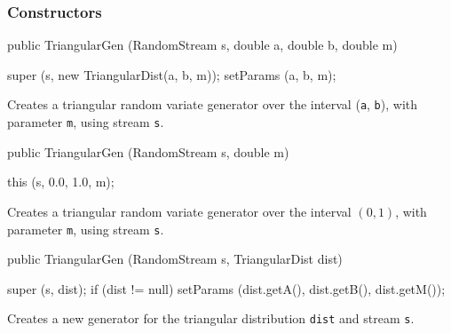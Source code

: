 \subsubsection* {Constructors}
\begin{code}

   public TriangularGen (RandomStream s, double a, double b, double m) \begin{hide} {
      super (s, new TriangularDist(a, b, m));
      setParams (a, b, m);
   }\end{hide}
\end{code} 
\begin{tabb}  Creates a triangular random variate generator over the interval
(\texttt{a}, \texttt{b}), with parameter \texttt{m}, using stream \texttt{s}. 
\end{tabb}
\begin{code}

   public TriangularGen (RandomStream s, double m) \begin{hide} {
      this (s, 0.0, 1.0, m);
   }\end{hide}
\end{code} 
\begin{tabb}  Creates a triangular random variate generator over the interval
  $(0, 1)$, with parameter \texttt{m}, using stream \texttt{s}.
\end{tabb}
\begin{code}
 
   public TriangularGen (RandomStream s, TriangularDist dist) \begin{hide} {
      super (s, dist);
      if (dist != null)
         setParams (dist.getA(), dist.getB(), dist.getM());
   }\end{hide}
\end{code}
\begin{tabb}  Creates a new generator for the triangular distribution
 \texttt{dist} and stream \texttt{s}.   
\end{tabb}

